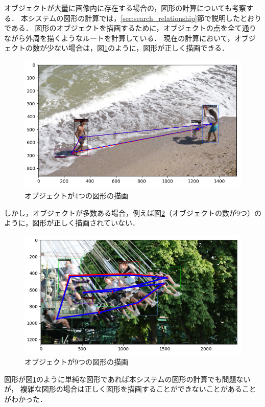 \documentclass[a4j,12pt,dvipdfmx]{jreport}
\begin{document}
オブジェクトが大量に画像内に存在する場合の，図形の計算についても考察する．
本システムの図形の計算では，\ref{sec:search_relationship}節で説明したとおりである．
図形のオブジェクトを描画するために，オブジェクトの点を全て通りながら外周を描くようなルートを計算している．
現在の計算において，オブジェクトの数が少ない場合は，図\ref{fig:img_2_4_4}のように，図形が正しく描画できる．
\begin{figure}[b]
  \centering
  \includegraphics[width=13cm]{image/result_2_4_4.png}
  \caption{オブジェクトが4つの図形の描画}
  \label{fig:img_2_4_4}
\end{figure}

しかし，オブジェクトが多数ある場合，例えば図\ref{fig:img_2_4_5}（オブジェクトの数が9つ）のように，図形が正しく描画されていない．
\begin{figure}[t]
  \centering
  \includegraphics[width=13cm]{image/result_2_4_5.png}
  \caption{オブジェクトが9つの図形の描画}
  \label{fig:img_2_4_5}
\end{figure}

図形が図\ref{fig:img_2_4_4}のように単純な図形であれば本システムの図形の計算でも問題ないが，
複雑な図形の場合は正しく図形を描画することができないことがあることがわかった．
\end{document}
